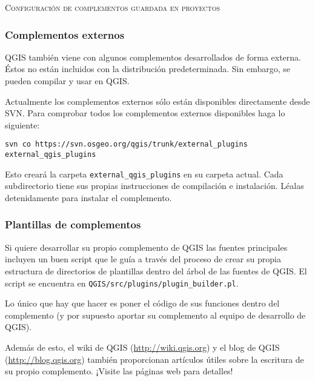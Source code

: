 \normalsize


\begin{Tip}\caption{\textsc{Configuración de complementos guardada en proyectos}}
\end{Tip}

%
%
\subsubsection{Complementos externos}\label{sec:external_plugins}

QGIS también viene con algunos complementos desarrollados de forma externa. Éstos no están incluidos con la distribución predeterminada. Sin embargo, se pueden compilar y usar en QGIS.

Actualmente los complementos externos sólo están disponibles directamente desde SVN. Para comprobar todos los complementos externos disponibles haga lo siguiente:
\begin{verbatim}
svn co https://svn.osgeo.org/qgis/trunk/external_plugins external_qgis_plugins
\end{verbatim}

Esto creará la carpeta \texttt{external\_qgis\_plugins} en su carpeta actual. Cada subdirectorio tiene sus propias instrucciones de compilación e instalación. Léalas detenidamente para instalar el complemento.

%
%
\subsubsection{Plantillas de complementos}\label{sec:plugin_template}

Si quiere desarrollar su propio complemento de QGIS las fuentes principales incluyen un buen script que le guía a través del proceso de crear su propia estructura de directorios de plantillas dentro del árbol de las fuentes de QGIS. El script se encuentra en \texttt{QGIS/src/plugins/plugin\_builder.pl}.

Lo único que hay que hacer es poner el código de sus funciones dentro del complemento (y por supuesto aportar su complemento al equipo de desarrollo de QGIS).

Además de esto, el wiki de QGIS (\url{http://wiki.qgis.org}) y el blog de QGIS (\url{http://blog.qgis.org}) también proporcionan artículos útiles sobre la escritura de su propio complemento. ¡Visite las páginas web para detalles!
